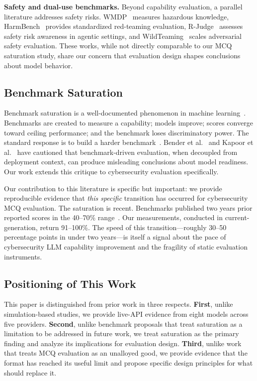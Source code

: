 \documentclass[journal]{IEEEtran}
\begin{document}
\textbf{Safety and dual-use benchmarks.} Beyond capability evaluation, a parallel literature addresses safety risks. WMDP~\cite{li2024wmdp} measures hazardous knowledge, HarmBench~\cite{mazeika2024harmbench} provides standardized red-teaming evaluation, R-Judge~\cite{yuan2024rjudge} assesses safety risk awareness in agentic settings, and WildTeaming~\cite{jiang2024wildteaming} scales adversarial safety evaluation. These works, while not directly comparable to our MCQ saturation study, share our concern that evaluation design shapes conclusions about model behavior.

\subsection{Benchmark Saturation}

Benchmark saturation is a well-documented phenomenon in machine learning~\cite{ott2022fairness,kiela2021dynabench,raji2021ai}. Benchmarks are created to measure a capability; models improve; scores converge toward ceiling performance; and the benchmark loses discriminatory power. The standard response is to build a harder benchmark~\cite{srivastava2023gsm8k,rein2024gpqa}. Bender et al.~\cite{bender2021dangers} and Kapoor et al.~\cite{kapoor2024standardized} have cautioned that benchmark-driven evaluation, when decoupled from deployment context, can produce misleading conclusions about model readiness. Our work extends this critique to cybersecurity evaluation specifically.

Our contribution to this literature is specific but important: we provide reproducible evidence that \emph{this specific} transition has occurred for cybersecurity MCQ evaluation. The saturation is recent. Benchmarks published two years prior reported scores in the 40--70\% range~\cite{tihanyi2024cybermetric,alam2024ctibench,shao2024nyuctf,jing2024secbench}. Our measurements, conducted in current-generation, return 91--100\%. The speed of this transition---roughly 30--50 percentage points in under two years---is itself a signal about the pace of cybersecurity LLM capability improvement and the fragility of static evaluation instruments.

\subsection{Positioning of This Work}

This paper is distinguished from prior work in three respects. \textbf{First}, unlike simulation-based studies, we provide live-API evidence from eight models across five providers. \textbf{Second}, unlike benchmark proposals that treat saturation as a limitation to be addressed in future work, we treat saturation as the primary finding and analyze its implications for evaluation design. \textbf{Third}, unlike work that treats MCQ evaluation as an unalloyed good, we provide evidence that the format has reached its useful limit and propose specific design principles for what should replace it.
\end{document}
